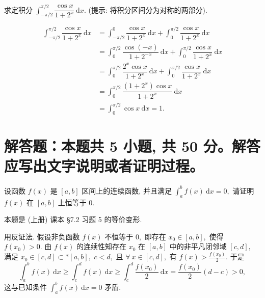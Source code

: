 \begin{question}[points = 10]
求定积分 $\displaystyle \int_{-\pi/2}^{\pi/2} \dfrac{\cos x}{1 + 2^x} ~ \mathrm{d}x.$ (提示: 将积分区间分为对称的两部分).

\end{question}

\begin{solution}
\begin{align*}
\int_{-\pi/2}^{\pi/2} \dfrac{\cos x}{1 + 2^x} ~ \mathrm{d}x & = \int_{-\pi/2}^{0} \dfrac{\cos x}{1 + 2^x} ~ \mathrm{d}x + \int_{0}^{\pi/2} \dfrac{\cos x}{1 + 2^x} ~ \mathrm{d}x \\
& = \int_{0}^{\pi/2} \dfrac{\cos (-x)}{1 + 2^{-x}} ~ \mathrm{d}x + \int_{0}^{\pi/2} \dfrac{\cos x}{1 + 2^x} ~ \mathrm{d}x \\
& = \int_{0}^{\pi/2} \dfrac{2^{x} \cos x}{1 + 2^{x}} ~ \mathrm{d}x + \int_{0}^{\pi/2} \dfrac{\cos x}{1 + 2^x} ~ \mathrm{d}x \\
& = \int_{0}^{\pi/2} \dfrac{(1 + 2^{x}) \cos x}{1 + 2^{x}} ~ \mathrm{d}x \\
& = \int_{0}^{\pi/2} \cos x ~ \mathrm{d}x = 1.
\end{align*}
\end{solution}


\section{解答题：本题共 5 小题, 共 50 分。解答应写出文字说明或者证明过程。}


\begin{question}[points = 8]
设函数 $f(x)$ 是 $[a, b]$ 区间上的连续函数, 并且满足 $\displaystyle \int_a^b f(x) ~ \mathrm{d}x = 0,$ 请证明 $f(x)$ 在 $[a, b]$ 上恒等于 $0.$

\end{question}

\begin{solution}
本题是 (上册) 课本 \S 7.2 习题 5 的等价变形.

用反证法. 假设非负函数 $f(x)$ 不恒等于 $0,$ 即存在 $x_0 \in [a,b],$ 使得 $f(x_0) > 0.$ 由 $f(x)$ 的连续性知存在 $x_0$ 在 $[a, b]$ 中的非平凡闭邻域 $[c, d],$ 满足 $x_0 \in [c, d] \subset* [a, b],$ $c < d,$ 且 $\forall ~ x \in [c, d],$ 有 $f(x) > \frac{f(x_0)}{2}.$ 于是
\begin{equation*}
\int_a^b f(x) ~ \mathrm{d}x \geqslant \int_c^d f(x) ~ \mathrm{d}x \geqslant \int_c^d \frac{f(x_0)}{2} ~ \mathrm{d}x = \frac{f(x_0)}{2}(d - c) > 0,
\end{equation*}
这与已知条件 $\displaystyle \int_a^b f(x) ~ \mathrm{d}x = 0$ 矛盾.
\end{solution}


